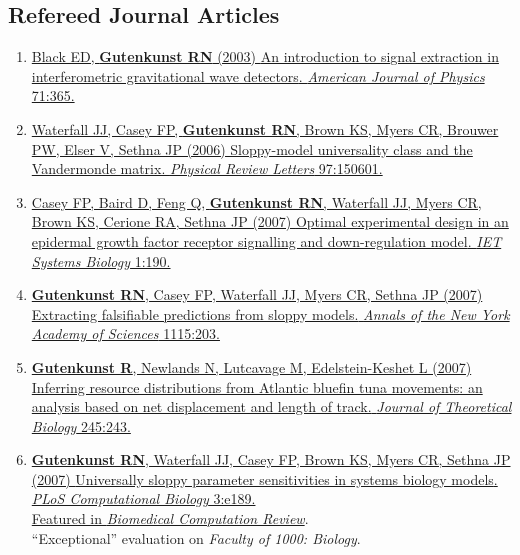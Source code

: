 \documentclass[11pt]{article}
\begin{document}
\subsection*{Refereed Journal Articles}
\begin{enumerate}


\item \href{http://doi.org/10.1119/1.1531578}{Black ED, \textbf{Gutenkunst RN} (2003) {An introduction to signal extraction in
  interferometric gravitational wave detectors}.
\newblock \emph{American Journal of Physics} 71:365.}

\item \href{https://doi.org/10.1103/PhysRevLett.97.150601}{\grad Waterfall JJ, Casey FP, \textbf{Gutenkunst RN}, Brown KS, Myers CR, Brouwer PW, Elser V, Sethna JP (2006) Sloppy-model universality class and the Vandermonde matrix. \emph{Physical Review Letters} 97:150601.}

\item \href{http://doi.org/10.1049/iet-syb:20060065}{\grad Casey FP\corresponding, Baird D, Feng Q, \textbf{Gutenkunst RN}, Waterfall JJ, Myers CR, Brown KS, Cerione RA, Sethna JP (2007) {Optimal experimental design in an epidermal growth factor receptor signalling and down-regulation model}.
\newblock \emph{IET Systems Biology} 1:190.}

\item \href{http://doi.org/10.1196/annals.1407.003}{\grad \textbf{Gutenkunst RN}\corresponding, Casey FP, Waterfall JJ, Myers CR, Sethna JP (2007)
  {Extracting falsifiable predictions from sloppy models.}
\newblock \emph{Annals of the New York Academy of Sciences} 1115:203.}

\item \href{http://doi.org/10.1016/j.jtbi.2006.10.014}{\grad \textbf{Gutenkunst R}\corresponding, Newlands N, Lutcavage M, Edelstein-Keshet L (2007)
  {Inferring resource distributions from Atlantic bluefin tuna movements: an
  analysis based on net displacement and length of track.}
\newblock \emph{Journal of Theoretical Biology} 245:243.}

\item \href{http://doi.org/10.1371/journal.pcbi.0030189}{\grad \textbf{Gutenkunst RN}\corresponding, Waterfall JJ, Casey FP, Brown KS, Myers CR, Sethna JP  (2007) {Universally sloppy parameter sensitivities in systems biology models}.
\newblock \emph{PLoS Computational Biology} 3:e189.}\\
  \href{http://biomedicalcomputationreview.org/content/%E2%80%9Csloppy%E2%80%9D-systems-biology}{Featured in \emph{Biomedical Computation Review}}.\\
 ``Exceptional'' evaluation on \textit{Faculty of 1000: Biology}.


\end{enumerate}
\end{document}
